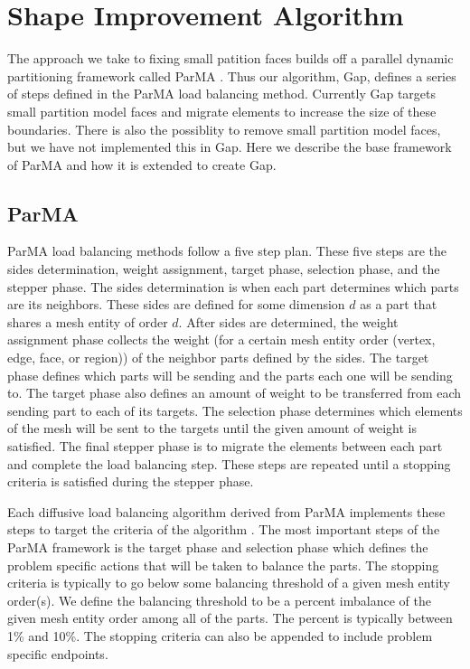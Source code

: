 \documentclass{thesis}
\begin{document}
\chapter{Shape Improvement Algorithm}

The approach we take to fixing small patition faces builds off a parallel 
dynamic partitioning framework called ParMA \cite{parma}. Thus our algorithm, 
Gap, defines a series of steps defined in the ParMA load balancing method. 
Currently Gap targets small partition model faces and migrate elements to 
increase the size of these boundaries. There is also the possiblity to remove 
small partition model faces, but we have not implemented this in Gap. Here we 
describe the base framework of ParMA and how it is extended to create Gap.

\section{ParMA}

ParMA load balancing methods follow a five step plan. These five steps 
are the sides determination, weight assignment, target phase, selection
phase, and the stepper phase. The sides determination is when each part 
determines which parts are its neighbors. These sides are defined for some
 dimension $d$ as a part that shares a mesh entity of order $d$. After sides are 
determined, the weight assignment phase collects the weight (for a certain 
mesh entity order (vertex, edge, face, or region)) of the neighbor parts 
defined by the sides. The 
target phase defines which parts will be sending and the parts each one 
will be sending to. The target phase also defines an amount of weight to 
be transferred from each sending part to each of its targets. The selection 
phase determines which elements of the mesh will be sent to the targets 
until the given amount of weight is satisfied. The final stepper phase is 
to migrate the elements between each part and complete the load balancing 
step. These steps are repeated until a stopping criteria is satisfied 
during the stepper phase. 

Each diffusive load balancing algorithm derived from ParMA implements these 
steps to target the criteria of the algorithm \cite{parma}. The most important 
steps of the ParMA framework is the target phase and selection phase which 
defines the problem specific actions that will be taken to balance the parts. 
The stopping criteria is typically to go below some balancing threshold of 
a given mesh entity order(s). We define the balancing threshold to be a 
percent imbalance of the given mesh entity order among all of the parts.
The percent is typically between 1\% and 10\%. The stopping criteria can also 
be appended to include problem specific endpoints.
 
\end{document}
